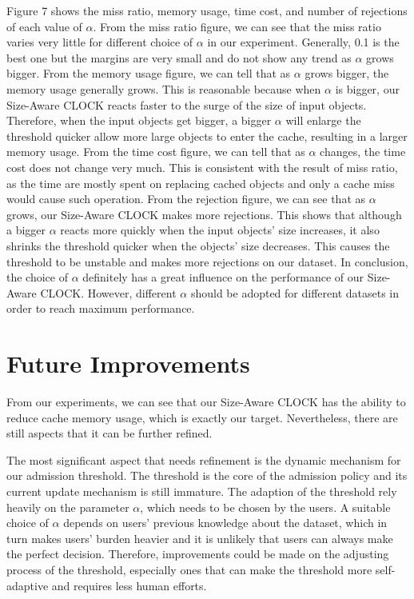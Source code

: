 \documentclass[conference]{IEEEtran}
\begin{document}
Figure 7 shows the miss ratio, memory usage, time cost, and number of rejections of each value of $\alpha$.
From the miss ratio figure, we can see that the miss ratio varies very little for different choice of $\alpha$ in our experiment. Generally, 0.1 is the best one but the margins are very small and do not show any trend as $\alpha$ grows bigger.
From the memory usage figure, we can tell that as $\alpha$ grows bigger, the memory usage generally grows. This is reasonable because when $\alpha$ is bigger, our Size-Aware CLOCK reacts faster to the surge of the size of input objects. Therefore, when the input objects get bigger, a bigger $\alpha$ will enlarge the threshold quicker allow more large objects to enter the cache, resulting in a larger memory usage.
From the time cost figure, we can tell that as $\alpha$ changes, the time cost does not change very much. This is consistent with the result of miss ratio, as the time are mostly spent on replacing cached objects and only a cache miss would cause such operation.
From the rejection figure, we can see that as $\alpha$ grows, our Size-Aware CLOCK makes more rejections. This shows that although a bigger $\alpha$ reacts more quickly when the input objects' size increases, it also shrinks the threshold quicker when the objects' size decreases. This causes the threshold to be unstable and makes more rejections on our dataset.
In conclusion, the choice of $\alpha$ definitely has a great influence on the performance of our Size-Aware CLOCK. However, different $\alpha$ should be adopted for different datasets in order to reach maximum performance.


\section{Future Improvements}
From our experiments, we can see that our Size-Aware CLOCK has the ability to reduce cache memory usage, which is exactly our target. Nevertheless, there are still aspects that it can be further refined. 

The most significant aspect that needs refinement is the dynamic mechanism for our admission threshold. The threshold is the core of the admission policy and its current update mechanism is still immature. The adaption of the threshold rely heavily on the parameter $\alpha$, which needs to be chosen by the users. A suitable choice of $\alpha$ depends on users' previous knowledge about the dataset, which in turn makes users' burden heavier and it is unlikely that users can always make the perfect decision. Therefore, improvements could be made on the adjusting process of the threshold, especially ones that can make the threshold more self-adaptive and requires less human efforts.
\end{document}
